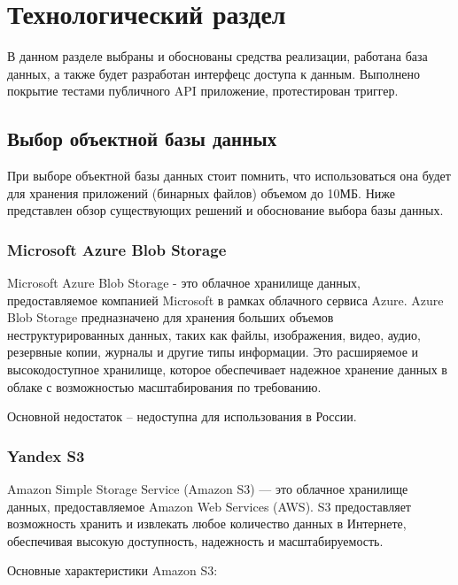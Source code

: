\section{Технологический раздел} \label{tech}

В данном разделе выбраны и обоснованы средства реализации, работана база данных, а также будет разработан интерфецс доступа к данным. Выполнено покрытие тестами публичного API приложение, протестирован триггер.


\subsection{Выбор объектной базы данных}

При выборе объектной базы данных стоит помнить, что использоваться она будет для хранения приложений (бинарных файлов) объемом до 10МБ. Ниже представлен обзор существующих решений и обоснование выбора базы данных.

\subsubsection{Microsoft Azure Blob Storage}

Microsoft Azure Blob Storage - это облачное хранилище данных, предоставляемое компанией Microsoft в рамках облачного сервиса Azure. Azure Blob Storage предназначено для хранения больших объемов неструктурированных данных, таких как файлы, изображения, видео, аудио, резервные копии, журналы и другие типы информации. Это расширяемое и высокодоступное хранилище, которое обеспечивает надежное хранение данных в облаке с возможностью масштабирования по требованию.

Основной недостаток -- недоступна для использования в России.


\subsubsection{Yandex S3}

Amazon Simple Storage Service (Amazon S3) --- это облачное хранилище данных, предоставляемое Amazon Web Services (AWS). S3 предоставляет возможность хранить и извлекать любое количество данных в Интернете, обеспечивая высокую доступность, надежность и масштабируемость.

Основные характеристики Amazon S3:

